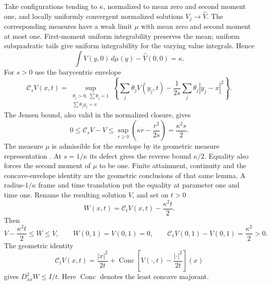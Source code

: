 Take configurations tending to $\kappa$, normalized to mean zero and
second moment one, and locally uniformly convergent normalized
solutions $V_j\to\widehat V$. The corresponding measures have a weak
limit $\mu$ with mean zero and second moment at most one. First-moment
uniform integrability preserves the mean; uniform subquadratic tails
give uniform integrability for the varying value integrals. Hence
\[
 \int\widehat V(y,0)\,d\mu(y)-\widehat V(0,0)=\kappa.
\]
For $s>0$ use the barycentric envelope
\[
 \mathcal C_sV(x,t)=
 \sup_{\substack{\theta_j>0,\ \sum\theta_j=1\\
                   \sum\theta_jy_j=x}}
 \left\{\sum_j\theta_jV(y_j,t)
              -\frac1{2s}\sum_j\theta_j|y_j-x|^2\right\}.
\]
The Jensen bound, also valid in the normalized closure, gives
\begin{equation}\label{eq:envelope-sandwich}
 0\leq\mathcal C_sV-V\leq
 \sup_{r\geq0}\left(\kappa r-\frac{r^2}{2s}\right)
 =\frac{\kappa^2s}{2}.
\end{equation}
The measure $\mu$ is admissible for the envelope by its geometric
measure representation \cite[Section 5]{OpenAI}. At $s=1/\kappa$
its defect gives the reverse bound $\kappa/2$. Equality also forces
the second moment of $\mu$ to be one. Finite attainment, continuity
and the concave-envelope identity are the geometric conclusions of
that same lemma. A radius-$1/\kappa$ frame and time translation put
the equality at parameter one and time one. Rename the resulting
solution $V$, and set on $t>0$
\[
 W(x,t)=\mathcal C_tV(x,t)-\frac{\kappa^2t}{2}.
\]
Then
\begin{equation}\label{eq:extremal-contact}
 V-\frac{\kappa^2t}{2}\leq W\leq V,\qquad
 W(0,1)=V(0,1)=0,\qquad
 \mathcal C_1V(0,1)-V(0,1)=\frac{\kappa^2}{2}>0.
\end{equation}
The geometric identity
\[
 \mathcal C_tV(x,t)=\frac{|x|^2}{2t}
  +\operatorname{Conc}\left[V(\cdot,t)-\frac{|\cdot|^2}{2t}\right](x)
\]
gives $D^2_{xx}W\leq I/t$. Here $\operatorname{Conc}$ denotes the
least concave majorant.

